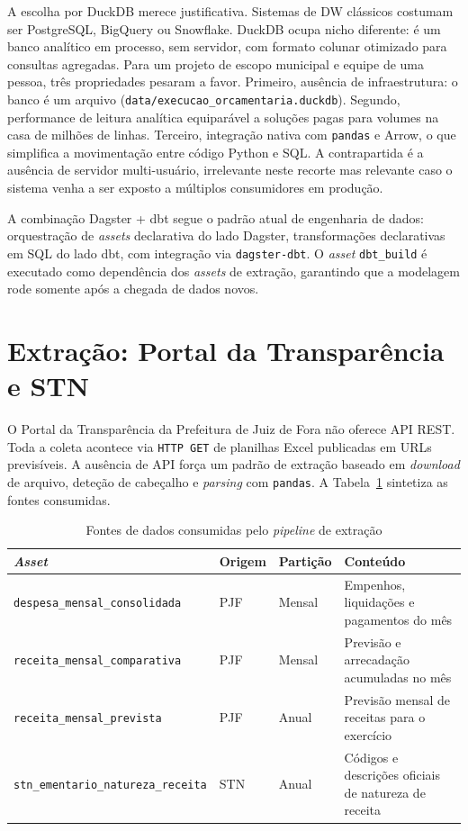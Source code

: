 A escolha por DuckDB merece justificativa. Sistemas de DW clássicos costumam ser PostgreSQL, BigQuery ou Snowflake. DuckDB ocupa nicho diferente: é um banco analítico em processo, sem servidor, com formato colunar otimizado para consultas agregadas. Para um projeto de escopo municipal e equipe de uma pessoa, três propriedades pesaram a favor. Primeiro, ausência de infraestrutura: o banco é um arquivo (\texttt{data/execucao\_orcamentaria.duckdb}). Segundo, performance de leitura analítica equiparável a soluções pagas para volumes na casa de milhões de linhas. Terceiro, integração nativa com \texttt{pandas} e Arrow, o que simplifica a movimentação entre código Python e SQL. A contrapartida é a ausência de servidor multi-usuário, irrelevante neste recorte mas relevante caso o sistema venha a ser exposto a múltiplos consumidores em produção.

A combinação Dagster + dbt segue o padrão atual de engenharia de dados: orquestração de \textit{assets} declarativa do lado Dagster, transformações declarativas em SQL do lado dbt, com integração via \texttt{dagster-dbt}. O \textit{asset} \texttt{dbt\_build} é executado como dependência dos \textit{assets} de extração, garantindo que a modelagem rode somente após a chegada de dados novos.

\section{Extração: Portal da Transparência e STN}
\label{sec:extracao}

O Portal da Transparência da Prefeitura de Juiz de Fora não oferece API REST. Toda a coleta acontece via \texttt{HTTP GET} de planilhas Excel publicadas em URLs previsíveis. A ausência de API força um padrão de extração baseado em \textit{download} de arquivo, deteção de cabeçalho e \textit{parsing} com \texttt{pandas}. A Tabela~\ref{tab:fontes} sintetiza as fontes consumidas.

\begin{table}[htb]
\caption{Fontes de dados consumidas pelo \textit{pipeline} de extração}
\label{tab:fontes}
\centering
\small
\begin{tabular}{p{3.4cm} p{3.0cm} p{2.0cm} p{4.8cm}}
\hline
\textbf{\textit{Asset}} & \textbf{Origem} & \textbf{Partição} & \textbf{Conteúdo} \\
\hline
\texttt{despesa\_mensal\_consolidada} & PJF & Mensal & Empenhos, liquidações e pagamentos do mês \\
\texttt{receita\_mensal\_comparativa} & PJF & Mensal & Previsão e arrecadação acumuladas no mês \\
\texttt{receita\_mensal\_prevista} & PJF & Anual & Previsão mensal de receitas para o exercício \\
\texttt{stn\_ementario\_natureza\_receita} & STN & Anual & Códigos e descrições oficiais de natureza de receita \\
\hline
\end{tabular}
\end{table}

